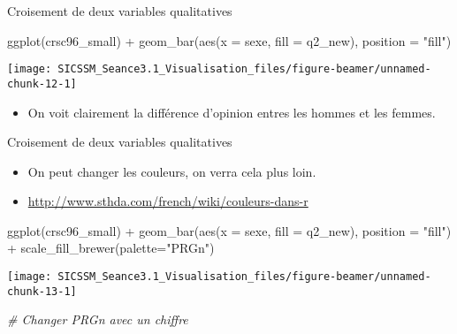 \documentclass[
  ignorenonframetext,
]{beamer}
\newenvironment{Shaded}{\begin{snugshade}}{\end{snugshade}}
\newcommand{\AttributeTok}[1]{\textcolor[rgb]{0.77,0.63,0.00}{#1}}
\newcommand{\CommentTok}[1]{\textcolor[rgb]{0.56,0.35,0.01}{\textit{#1}}}
\newcommand{\FunctionTok}[1]{\textcolor[rgb]{0.00,0.00,0.00}{#1}}
\newcommand{\NormalTok}[1]{#1}
\newcommand{\SpecialCharTok}[1]{\textcolor[rgb]{0.00,0.00,0.00}{#1}}
\newcommand{\StringTok}[1]{\textcolor[rgb]{0.31,0.60,0.02}{#1}}
\providecommand{\tightlist}{%
  \setlength{\itemsep}{0pt}\setlength{\parskip}{0pt}}
\begin{document}
\begin{frame}[fragile]{Croisement de deux variables qualitatives}
\protect\hypertarget{croisement-de-deux-variables-qualitatives-1}{}
\begin{Shaded}
\begin{Highlighting}[]
\FunctionTok{ggplot}\NormalTok{(crsc96\_small) }\SpecialCharTok{+}
  \FunctionTok{geom\_bar}\NormalTok{(}\FunctionTok{aes}\NormalTok{(}\AttributeTok{x =}\NormalTok{ sexe, }\AttributeTok{fill =}\NormalTok{ q2\_new), }\AttributeTok{position =} \StringTok{"fill"}\NormalTok{)  }
\end{Highlighting}
\end{Shaded}

\begin{center}\texttt{[image: SICSSM\_Seance3.1\_Visualisation\_files/figure-beamer/unnamed-chunk-12-1]} \end{center}

\begin{itemize}
\tightlist
\item
  On voit clairement la différence d'opinion entres les hommes et les
  femmes.
\end{itemize}
\end{frame}

\begin{frame}[fragile]{Croisement de deux variables qualitatives}
\protect\hypertarget{croisement-de-deux-variables-qualitatives-2}{}
\begin{itemize}
\tightlist
\item
  On peut changer les couleurs, on verra cela plus loin.
\item
  \url{http://www.sthda.com/french/wiki/couleurs-dans-r}
\end{itemize}

\begin{Shaded}
\begin{Highlighting}[]
\FunctionTok{ggplot}\NormalTok{(crsc96\_small) }\SpecialCharTok{+}
  \FunctionTok{geom\_bar}\NormalTok{(}\FunctionTok{aes}\NormalTok{(}\AttributeTok{x =}\NormalTok{ sexe, }\AttributeTok{fill =}\NormalTok{ q2\_new), }\AttributeTok{position =} \StringTok{"fill"}\NormalTok{) }\SpecialCharTok{+}
  \FunctionTok{scale\_fill\_brewer}\NormalTok{(}\AttributeTok{palette=}\StringTok{"PRGn"}\NormalTok{) }
\end{Highlighting}
\end{Shaded}

\begin{center}\texttt{[image: SICSSM\_Seance3.1\_Visualisation\_files/figure-beamer/unnamed-chunk-13-1]} \end{center}

\begin{Shaded}
\begin{Highlighting}[]
\CommentTok{\# Changer PRGn avec un chiffre}
\end{Highlighting}
\end{Shaded}
\end{frame}
\end{document}
